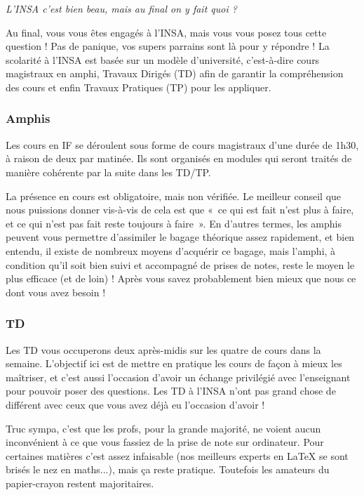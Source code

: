 \vspace{1em}
\begin{citationii}
\emph{L'INSA c'est bien beau, mais au final on y fait quoi ?}
\end{citationii}
Au final, vous vous êtes engagés à l'INSA, mais vous vous posez tous cette
question !
Pas de panique, vos supers parrains sont là pour y répondre !
La scolarité à l'INSA est basée sur un modèle d'université, c'est-à-dire cours
magistraux en amphi, Travaux Dirigés (TD) afin de garantir la compréhension des
cours et enfin Travaux Pratiques (TP) pour les appliquer.

\subsubsection{Amphis}
Les cours en IF se déroulent sous forme de cours magistraux d'une durée de
1h30, à raison de deux par matinée. Ils sont organisés en modules qui
seront traités de manière cohérente par la suite dans les TD/TP.

\vspace{1em}

La présence en cours est obligatoire, mais non vérifiée. Le meilleur conseil que
nous puissions donner vis-à-vis de cela est que «~ce qui est fait n'est plus à
faire, et ce qui n'est pas fait reste toujours à faire~». En d'autres termes, les
amphis peuvent vous permettre d'assimiler le bagage théorique assez rapidement, et bien
entendu, il existe de nombreux moyens d'acquérir ce bagage, mais l'amphi, à
condition qu'il soit bien suivi et accompagné de prises de notes, reste le moyen le plus 
efficace (et de loin) ! Après vous savez probablement bien mieux que nous ce dont vous avez besoin !
\subsubsection{TD}
Les TD vous occuperons deux après-midis sur les quatre de cours dans la semaine.
L'objectif ici est de mettre en pratique les cours de façon à mieux les
maîtriser, et c'est aussi l'occasion d'avoir un échange privilégié avec
l'enseignant pour pouvoir poser des questions. Les TD à l'INSA n'ont pas grand chose
de différent avec ceux que vous avez déjà eu l'occasion d'avoir ! 

\vspace{1em}

Truc sympa, c'est que les profs, pour la grande majorité, ne voient aucun
inconvénient à ce que vous fassiez de la prise de note sur ordinateur. Pour
certaines matières c'est assez infaisable (nos meilleurs experts en \LaTeX{} se
sont brisés le nez en maths...), mais ça reste pratique. Toutefois les
amateurs du papier-crayon restent majoritaires.
